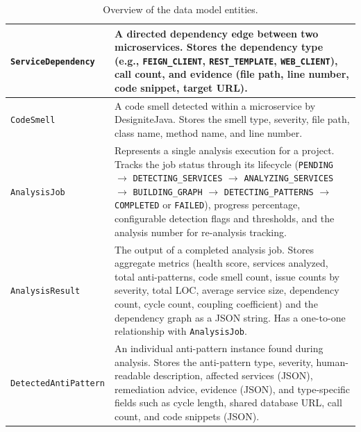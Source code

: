 \begin{table}[htbp]
\begin{tabular}{|l|p{9cm}|}
        \hline
        \texttt{ServiceDependency}   & A directed dependency edge between two microservices. Stores the dependency type (e.g., \texttt{FEIGN\_CLIENT}, \texttt{REST\_TEMPLATE}, \texttt{WEB\_CLIENT}), call count, and evidence (file path, line number, code snippet, target URL).                                                                                                                                                                                  \\
        \hline
        \texttt{CodeSmell}           & A code smell detected within a microservice by DesigniteJava. Stores the smell type, severity, file path, class name, method name, and line number.                                                                                                                                                                                                                                                                           \\
        \hline
        \texttt{AnalysisJob}         & Represents a single analysis execution for a project. Tracks the job status through its lifecycle (\texttt{PENDING} $\to$ \texttt{DETECTING\_SERVICES} $\to$ \texttt{ANALYZING\_SERVICES} $\to$ \texttt{BUILDING\_GRAPH} $\to$ \texttt{DETECTING\_PATTERNS} $\to$ \texttt{COMPLETED} or \texttt{FAILED}), progress percentage, configurable detection flags and thresholds, and the analysis number for re-analysis tracking. \\
        \hline
        \texttt{AnalysisResult}      & The output of a completed analysis job. Stores aggregate metrics (health score, services analyzed, total anti-patterns, code smell count, issue counts by severity, total LOC, average service size, dependency count, cycle count, coupling coefficient) and the dependency graph as a JSON string. Has a one-to-one relationship with \texttt{AnalysisJob}.                                                                 \\
        \hline
        \texttt{DetectedAntiPattern} & An individual anti-pattern instance found during analysis. Stores the anti-pattern type, severity, human-readable description, affected services (JSON), remediation advice, evidence (JSON), and type-specific fields such as cycle length, shared database URL, call count, and code snippets (JSON).                                                                                                                       \\
        \hline
    \end{tabular}
    \caption{Overview of the data model entities.}
    \label{tab:entities}
\end{table}

